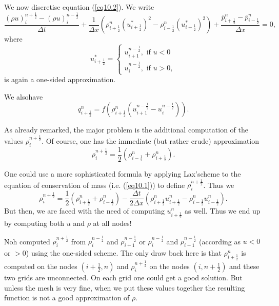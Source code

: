We now discretise equation (\ref{eq10.2}). We write
\begin{equation*}
\frac{(\rho u)^{n+\frac{1}{2}}_i - (\rho u)^{n-\frac{1}{2}}_i}{\Delta t} + \frac{1}{\Delta x} (\rho^n_{i+\frac{1}{2}} (u^*_{i+\frac{1}{2}})^2 - \rho^n_{i-\frac{1}{2}} (u^*_{i-\frac{1}{2}})^2) + \frac{\bar{p}^n_{i+\frac{1}{2}} - \bar{p}^n_{i-\frac{1}{2}}}{\Delta x}  = 0,
\tag{10.8}\label{eq10.8}
\end{equation*}
where
\begin{equation*}
u^*_{i+\frac{1}{2}} = 
\begin{cases}
u^{n-\frac{1}{2}}_{i+1}, \text{ if } u < 0\\
u^{n-\frac{1}{2}}_i , \text{ if } u > 0,
\end{cases}
\tag{10.9}\label{eq10.9}
\end{equation*}
is again a one-sided approximation.

We also\pageoriginale have 
\begin{equation*}
q^n_{i+\frac{1}{2}} = f(\rho^n_{i+\frac{1}{2}} (u^{n-\frac{1}{2}}_{i+1} - u^{n-\frac{1}{2}}_i)). 
\tag{10.10}\label{eq10.10}
\end{equation*}

As already remarked, the major problem is the additional computation of the values $\rho^{n+\frac{1}{2}}_i$. Of course, one has the immediate (but rather crude) approximation
\begin{equation*}
\rho^{n+\frac{1}{2}}_i = \frac{1}{2} (\rho^n_{i-\frac{1}{2}} + \rho^n_{i+\frac{1}{2}}). 
\tag{10.11}\label{eq10.11}
\end{equation*}

One could use a more sophisticated formula by applying Lax'\break scheme to
the equation of conservation of mass (i.e. (\ref{eq10.1})) to define
$\rho^{n+\frac{1}{2}}_i$. Thus we  
\begin{equation*}
\rho^{n+\frac{1}{2}}_i = \frac{1}{2} (\rho^n_{i+\frac{1}{2}} + \rho^n_{i-\frac{1}{2}}) - \frac{\Delta t}{2 \Delta x} (\rho^n_{i+\frac{1}{2}} u^n_{i+\frac{1}{2}} - \rho^n_{i-\frac{1}{2}} u^n_{i-\frac{1}{2}}). \tag{10.12}\label{eq10.12}
\end{equation*}
But then, we are faced with the need of computing $u^n_{i+\frac{1}{2}}$ as well. Thus we end up by computing both $u$ and $\rho$ at all nodes!

Noh \cite{key29} computed $\rho^{n+\frac{1}{2}}_i$ from $\rho^{n-\frac{1}{2}}_i$ and $\rho^{n-\frac{1}{2}}_{i+1}$ or $\rho^{n-\frac{1}{2}}_i$ and $\rho^{n-\frac{1}{2}}_{i-1}$ (according as $u<0$ or $>0$) using the one-sided scheme. The only draw back here is that $\rho^{n}_{i + \frac{1}{2}}$ is computed on the nodes $(i+\frac{1}{2}, n)$ and $\rho^{n+\frac{1}{2}}_i$ on the nodes $(i, n + \frac{1}{2})$ and these two grids are unconnected. On each grid one could get a good solution. But unless the mesh is very fine, when we put these values together the resulting function is not a good approximation of $\rho$.

